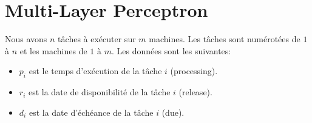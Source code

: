 \documentclass[11pt]{article}
\begin{document}

\maketitle %

\thispagestyle{empty} %

\newpage


\section{Multi-Layer Perceptron}

Nous avons $n$ tâches à exécuter sur $m$ machines. Les tâches sont numérotées de $1$ à $n$ et les machines de $1$ à $m$. Les données sont les suivantes:

\begin{itemize}
	\item $p_i$ est le temps d'exécution de la tâche $i$ (processing).
	\item $r_i$ est la date de disponibilité de la tâche $i$ (release).
	\item $d_i$ est la date d'échéance de la tâche $i$ (due).
\end{itemize}



\end{document}
